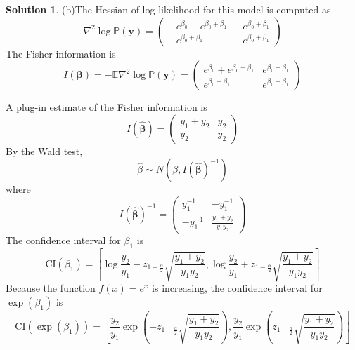 \documentclass[11pt,letterpaper,english,oneside]{article} %
\theoremstyle{definition} %
\newtheorem{solution}{Solution}
\newenvironment{sol}{\begin{solution}\hspace{0pt}}{\end{solution}}
\begin{document}
\begin{sol}
(b)The Hessian of log likelihood for this model is computed as
\begin{equation}
	\nabla^2\log\mathbb{P}(\bm{y})=\begin{pmatrix}
	-e^{\beta_0}-e^{\beta_0+\beta_1} & -e^{\beta_0+\beta_1}\\
	-e^{\beta_0+\beta_1} & -e^{\beta_0+\beta_1}
	\end{pmatrix}
\end{equation}
The Fisher information is 
\begin{equation}
	I(\bm{\beta})=-\mathbb{E}	\nabla^2\log\mathbb{P}(\bm{y})=\begin{pmatrix}
		e^{\beta_0}+e^{\beta_0+\beta_1} & e^{\beta_0+\beta_1}\\
		e^{\beta_0+\beta_1} & e^{\beta_0+\beta_1}
	\end{pmatrix}
\end{equation}

A plug-in estimate of the Fisher information is 
\begin{equation}
	I(\hat{\bm{\beta}})=\begin{pmatrix}
		y_1+y_2& y_2\\
		y_2 & y_2
	\end{pmatrix}
\end{equation}
By the Wald test,
\begin{equation}
	\hat{\beta}\sim N(\beta,	I(\hat{\bm{\beta}})^{-1})
\end{equation}
where
\begin{equation}
	I(\hat{\bm{\beta}})^{-1}=\begin{pmatrix}
		y_1^{-1} & -y_1^{-1}\\
		-y_1^{-1}&\frac{y_1+y_2}{y_1y_2}
	\end{pmatrix}
\end{equation}
The confidence interval for $\beta_1$ is
\begin{equation}
	\text{CI}(\beta_1)=\left[\log\frac{y_2}{y_1}-z_{1-\frac{\alpha}{2}}\sqrt{\frac{y_1+y_2}{y_1y_2}},\log\frac{y_2}{y_1}+z_{1-\frac{\alpha}{2}}\sqrt{\frac{y_1+y_2}{y_1y_2}}\right]
\end{equation}
Because the function $f(x)=e^x$ is increasing, the confidence interval for $\exp(\beta_1)$ is
\begin{equation}
	\text{CI}(\exp(\beta_1))=\left[\frac{y_2}{y_1}\exp\left(-z_{1-\frac{\alpha}{2}}\sqrt{\frac{y_1+y_2}{y_1y_2}}\right),\frac{y_2}{y_1}\exp\left(z_{1-\frac{\alpha}{2}}\sqrt{\frac{y_1+y_2}{y_1y_2}}\right)\right]
\end{equation}


\end{sol}
\end{document}
